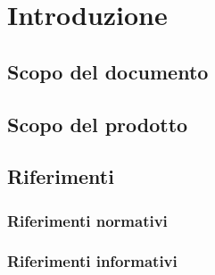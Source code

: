 \documentclass[AnalisiDeiRequisiti.tex]{subfiles}
\begin{document}
\chapter{Introduzione}
\section{Scopo del documento}

\section{Scopo del prodotto}


\section{Riferimenti}

\subsection{Riferimenti normativi}

\subsection{Riferimenti informativi}
\end{document}
